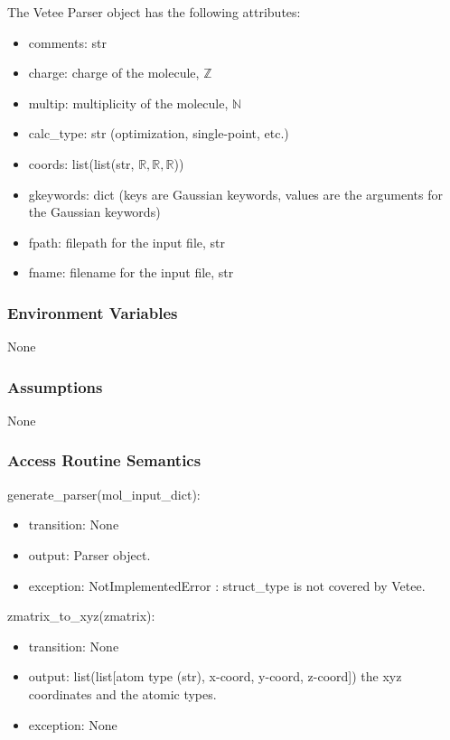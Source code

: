 \documentclass[12pt, titlepage]{article}
\begin{document}
The Vetee Parser object has the following attributes:
\begin{itemize}
	\item comments: str
	\item charge: charge of the molecule, $\mathbb{Z}$
	\item multip: multiplicity of the molecule, $\mathbb{N}$
	\item calc\_type: str (optimization, single-point, etc.)
	\item coords: list(list(str, $\mathbb{R}, \mathbb{R}, \mathbb{R}$))
	\item gkeywords: dict (keys are Gaussian keywords, values are the arguments 
	for the Gaussian keywords)
	\item fpath: filepath for the input file, str
	\item fname: filename for the input file, str
\end{itemize}

\subsubsection{Environment Variables}

None

\subsubsection{Assumptions}

None

\subsubsection{Access Routine Semantics}

\noindent generate\_parser(mol\_input\_dict):
\begin{itemize}
	\item transition: None
	\item output: Parser object.
	\item exception: NotImplementedError : struct\_type is not covered by Vetee.
\end{itemize}

\noindent zmatrix\_to\_xyz(zmatrix):
\begin{itemize}
	\item transition: None
	\item output: list(list[atom type (str), x-coord, y-coord, z-coord]) the 
	xyz coordinates and the atomic types.
	\item exception: None
\end{itemize}
\end{document}
